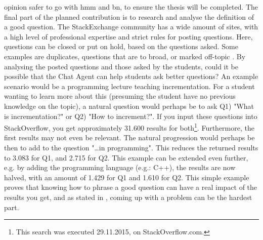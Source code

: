opinion safer to go with \gls{hmm} and \gls{bn}, to ensure the thesis will be completed. 
\vspace{0.5em}\newline
The final part of the planned contribution is to research and analyse the definition of a good question. The StackExchange community has a wide amount of sites, with a high level 
of professional expertise and strict rules for posting questions. Here, questions can be closed or put on hold, based on the questions asked. Some examples are duplicates, questions 
that are to broad, or marked off-topic \citet{Stackoverflow.com2015,CommunityWiki2015}. By analysing the posted questions and those asked by the students, could it be possible 
that the Chat Agent can help students ask better questions? An example scenario would be a programming lecture teaching incrementation. For a student wanting to learn more about this 
(presuming the student have no previous knowledge on the topic), a natural question would perhaps be to ask Q1) "What is incrementation?" or Q2) "How to increment?". If you input 
these questions into StackOverflow, you get approximately 31.600 results for both\footnote{This search was executed 29.11.2015, on StackOverflow.com.}. Furthermore, the first results 
may not even be relevant. The natural progression would perhaps be then to add to the question "\ldots in programming". This reduces the returned results to 3.083 for Q1, and 2.715 
for Q2. This example can be extended even further, e.g. by adding the programming language (e.g.: C++), the results are now halved, with an amount of 1.429 for Q1 and 1.610 for Q2. 
This simple example proves that knowing how to phrase a good question can have a real impact of the results you get, and as stated in \citet{Lucky2011}, coming up with a problem can be 
the hardest part.
